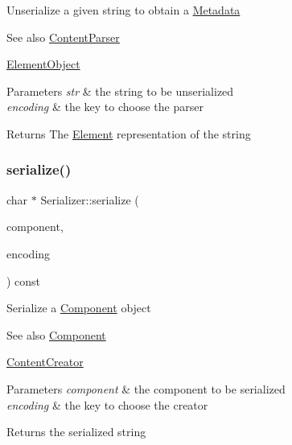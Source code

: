 Unserialize a given string to obtain a \mbox{\hyperlink{classMetadata}{Metadata}} \begin{DoxySeeAlso}{See also}
\mbox{\hyperlink{classContentParser}{Content\+Parser}} 

\mbox{\hyperlink{classElementObject}{Element\+Object}}
\end{DoxySeeAlso}

\begin{DoxyParams}{Parameters}
{\em str} & the string to be unserialized \\
\hline
{\em encoding} & the key to choose the parser \\
\hline
\end{DoxyParams}
\begin{DoxyReturn}{Returns}
The \mbox{\hyperlink{classElement}{Element}} representation of the string 
\end{DoxyReturn}
\mbox{\label{classSerializer_a5cfe31eb70f4d0c92f2d68c22f39e885}} 
\subsubsection{\texorpdfstring{serialize()}{serialize()}\hspace{0.1cm}{\footnotesize\ttfamily [1/2]}}
{\footnotesize\ttfamily char $\ast$ Serializer\+::serialize (\begin{DoxyParamCaption}\item[{const \mbox{\hyperlink{classComponent}{Component}} $\ast$}]{component,  }\item[{const char $\ast$}]{encoding }\end{DoxyParamCaption}) const\hspace{0.3cm}{\ttfamily [virtual]}}

Serialize a \mbox{\hyperlink{classComponent}{Component}} object \begin{DoxySeeAlso}{See also}
\mbox{\hyperlink{classComponent}{Component}} 

\mbox{\hyperlink{classContentCreator}{Content\+Creator}}
\end{DoxySeeAlso}

\begin{DoxyParams}{Parameters}
{\em component} & the component to be serialized \\
\hline
{\em encoding} & the key to choose the creator \\
\hline
\end{DoxyParams}
\begin{DoxyReturn}{Returns}
the serialized string 
\end{DoxyReturn}
\mbox{\label{classSerializer_a38bec517fb3b3cc0778c75b807cb930c}} 
